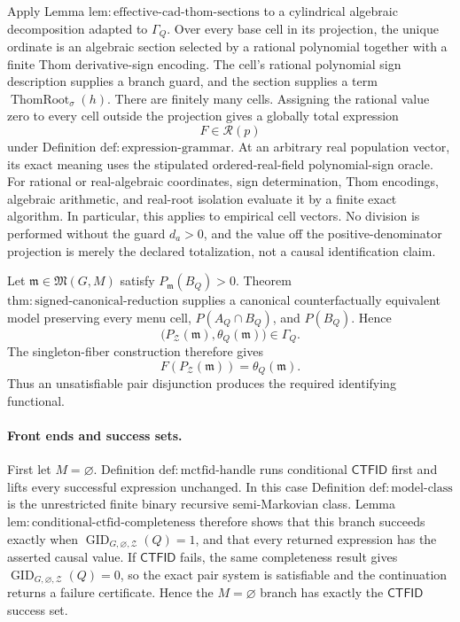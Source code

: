 Apply Lemma \(\mathrm{lem:effective\text{-}cad\text{-}thom\text{-}sections}\) to a cylindrical algebraic decomposition adapted to \(\Gamma_Q\).  Over every base cell in its projection, the unique ordinate is an algebraic section selected by a rational polynomial together with a finite Thom derivative-sign encoding.  The cell's rational polynomial sign description supplies a branch guard, and the section supplies a term \(\operatorname{ThomRoot}_{\sigma}(h)\).  There are finitely many cells.  Assigning the rational value zero to every cell outside the projection gives a globally total expression
\[
 F\in\mathcal R(p)
\]
under Definition \(\mathrm{def:expression\text{-}grammar}\).  At an arbitrary real population vector, its exact meaning uses the stipulated ordered-real-field polynomial-sign oracle.  For rational or real-algebraic coordinates, sign determination, Thom encodings, algebraic arithmetic, and real-root isolation evaluate it by a finite exact algorithm.  In particular, this applies to empirical cell vectors.  No division is performed without the guard \(d_a>0\), and the value off the positive-denominator projection is merely the declared totalization, not a causal identification claim.

Let \(\mathfrak m\in\mathfrak M(G,M)\) satisfy \(P_{\mathfrak m}(B_Q)>0\).  Theorem \(\mathrm{thm:signed\text{-}canonical\text{-}reduction}\) supplies a canonical counterfactually equivalent model preserving every menu cell, \(P(A_Q\cap B_Q)\), and \(P(B_Q)\).  Hence
\[
 \bigl(P_{\mathcal Z}(\mathfrak m),\theta_Q(\mathfrak m)\bigr)
 \in\Gamma_Q.
\]
The singleton-fiber construction therefore gives
\[
 F(P_{\mathcal Z}(\mathfrak m))=\theta_Q(\mathfrak m).
\]
Thus an unsatisfiable pair disjunction produces the required identifying functional.

\paragraph{Front ends and success sets.}
First let \(M=\varnothing\).  Definition \(\mathrm{def:mctfid\text{-}handle}\) runs conditional \(\mathsf{CTFID}\) first and lifts every successful expression unchanged.  In this case Definition \(\mathrm{def:model\text{-}class}\) is the unrestricted finite binary recursive semi-Markovian class.  Lemma \(\mathrm{lem:conditional\text{-}ctfid\text{-}completeness}\) therefore shows that this branch succeeds exactly when \(\operatorname{GID}_{G,\varnothing,\mathcal Z}(Q)=1\), and that every returned expression has the asserted causal value.  If \(\mathsf{CTFID}\) fails, the same completeness result gives \(\operatorname{GID}_{G,\varnothing,\mathcal Z}(Q)=0\), so the exact pair system is satisfiable and the continuation returns a failure certificate.  Hence the \(M=\varnothing\) branch has exactly the \(\mathsf{CTFID}\) success set.

